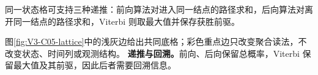 \documentclass[UTF8,a4paper,11pt,openany]{ctexbook}
\begin{document}
\setcounter{page}{467}
\setcounter{chapter}{21}
\setcounter{figure}{0}
\pagestyle{headings}
\begin{geometrybox}
同一状态格可支持三种递推：前向算法对进入同一结点的路径求和，后向算法对离开同一结点的路径求和，Viterbi 则取最大值并保存获胜前驱。
\end{geometrybox}

图\ref{fig:V3-C05-lattice}中的浅灰边给出共同底格；彩色重点边只改变聚合读法，不改变状态、时间列或观测结构。
\textbf{递推与回溯。}前向、后向保留总概率，Viterbi 保留最大值及其前驱，因此后者需要回溯信息。
\end{document}
